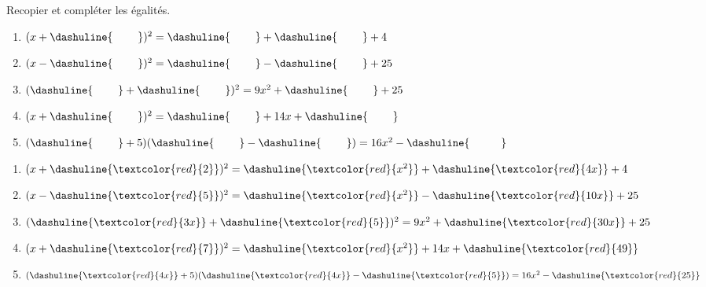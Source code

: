 \begin{exo} Recopier et compléter les égalités.
	\label{cpl1}
	
\begin{enumerate}[label=\bf{\alph*)\,}]		
		
\item 		$(x+\dashuline{\hspace{0.8cm}})^2 = \dashuline{\hspace{0.8cm}}+\dashuline{\hspace{0.8cm}}+4$
		
\item		$(x-\dashuline{\hspace{0.8cm}})^2=\dashuline{\hspace{0.8cm}}-\dashuline{\hspace{0.8cm}}+25$
		
\item		$(\dashuline{\hspace{0.8cm}}+\dashuline{\hspace{0.8cm}})^2 = 9x^2+\dashuline{\hspace{0.8cm}}+25$
		
\item		$(x+\dashuline{\hspace{0.8cm}})^2= \dashuline{\hspace{0.8cm}}+14x+\dashuline{\hspace{0.8cm}}$
		
\item $   (\dashuline{\hspace{.8cm}}+5)(\dashuline{\hspace{.8cm}}-\dashuline{\hspace{.8cm}})= 16x^2-\dashuline{\hspace{1cm}}$ 
\end{enumerate}


\begin{sol*}

\begin{enumerate}[label=\bf{\alph*)\,}]		
		
\item 		$(x+\dashuline{\textcolor{red}{2}})^2 = \dashuline{\textcolor{red}{x^2}}+\dashuline{\textcolor{red}{4x}}+4$
		
\item		$(x-\dashuline{\textcolor{red}{5}})^2=\dashuline{\textcolor{red}{x^2}}-\dashuline{\textcolor{red}{10x}}+25$
		
\item		$(\dashuline{\textcolor{red}{3x}}+\dashuline{\textcolor{red}{5}})^2 = 9x^2+\dashuline{\textcolor{red}{30x}}+25$
		
\item		$(x+\dashuline{\textcolor{red}{7}})^2= \dashuline{\textcolor{red}{x^2}}+14x+\dashuline{\textcolor{red}{49}}$
		
\item $   (\dashuline{\textcolor{red}{4x}}+5)(\dashuline{\textcolor{red}{4x}}-\dashuline{\textcolor{red}{5}})= 16x^2-\dashuline{\textcolor{red}{25}}$ 
\end{enumerate}


\end{sol*}

\end{exo}	
